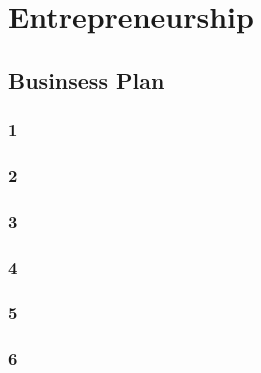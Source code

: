 \section{Entrepreneurship}
\subsection{Businsess Plan}
\subsubsection{1}
\label{subsubsec:ent_bp1}
\subsubsection{2}
\label{subsubsec:ent_bp2}
\subsubsection{3}
\label{subsubsec:ent_bp3}
\subsubsection{4}
\label{subsubsec:ent_bp4}
\subsubsection{5}
\label{subsubsec:ent_bp5}
\subsubsection{6}
\label{subsubsec:ent_bp6}

